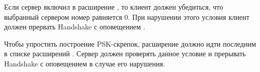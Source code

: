 Если сервер включил в  расширение
, то клиент должен убедиться, что выбранный 
сервером номер  равняется 0. При нарушении этого 
условия клиент должен прервать Handshake с оповещением 
.

Чтобы упростить построение PSK-скрепок, расширение  должно 
идти последним в списке расширений . Сервер должен 
проверять данное условие и прерывать Handshake с оповещением 
 в случае его нарушения.

